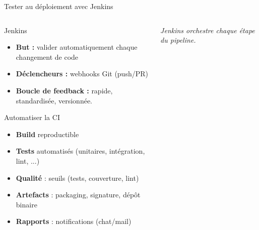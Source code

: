 \documentclass[aspectratio=169,10pt]{beamer}
\begin{document}
\begin{frame}{Tester au déploiement avec Jenkins}
  \begin{columns}[T,onlytextwidth]
    \begin{column}{.58\linewidth}
      \begin{alertblock}{Jenkins}
        \begin{itemize}
          \item \textbf{But :} valider automatiquement chaque changement de code
          \item \textbf{Déclencheurs :} webhooks Git (push/PR)
          \item \textbf{Boucle de feedback :} rapide, standardisée, versionnée.
        \end{itemize}
      \end{alertblock}

      \begin{alertblock}{Automatiser la CI}
        \begin{itemize}    
          \item \textbf{Build} reproductible 
          \item \textbf{Tests} automatisés (unitaires, intégration, lint, ...)
          \item \textbf{Qualité} : seuils (tests, couverture, lint)
          \item \textbf{Artefacts} : packaging, signature, dépôt binaire
          \item \textbf{Rapports} : notifications (chat/mail)
        \end{itemize}
      \end{alertblock}
    \end{column}

    \begin{column}{.38\linewidth}
      \centering
      
      \vspace{1ex}
      \small \emph{Jenkins orchestre chaque étape du pipeline.}
    \end{column}
  \end{columns}
\end{frame}
\end{document}

